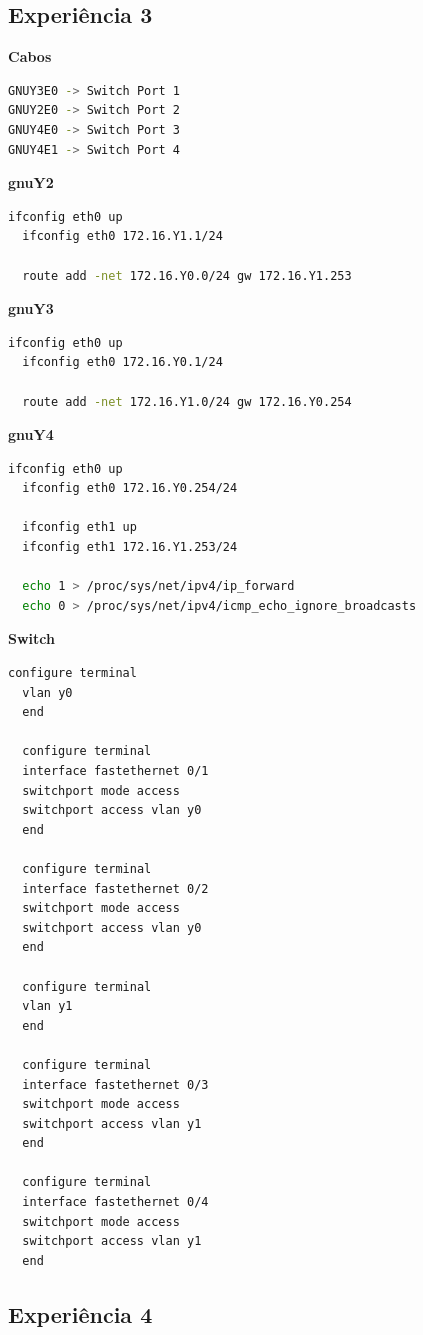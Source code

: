 \documentclass[article, a4paper, 11pt, oneside]{memoir}
\begin{document}
\subsection{Experiência 3} \label{exp3-conf}

\textbf{Cabos}
\begin{lstlisting}[language=bash]
GNUY3E0 -> Switch Port 1
GNUY2E0 -> Switch Port 2
GNUY4E0 -> Switch Port 3
GNUY4E1 -> Switch Port 4
\end{lstlisting}

\textbf{gnuY2}
\begin{lstlisting}[language=bash]
  ifconfig eth0 up
  ifconfig eth0 172.16.Y1.1/24

  route add -net 172.16.Y0.0/24 gw 172.16.Y1.253
\end{lstlisting}

\textbf{gnuY3}
\begin{lstlisting}[language=bash]
  ifconfig eth0 up
  ifconfig eth0 172.16.Y0.1/24

  route add -net 172.16.Y1.0/24 gw 172.16.Y0.254
\end{lstlisting}

\textbf{gnuY4}
\begin{lstlisting}[language=bash]
  ifconfig eth0 up
  ifconfig eth0 172.16.Y0.254/24

  ifconfig eth1 up 
  ifconfig eth1 172.16.Y1.253/24

  echo 1 > /proc/sys/net/ipv4/ip_forward
  echo 0 > /proc/sys/net/ipv4/icmp_echo_ignore_broadcasts
\end{lstlisting}

\textbf{Switch}
\begin{lstlisting}[language=bash]
  configure terminal
  vlan y0
  end

  configure terminal
  interface fastethernet 0/1
  switchport mode access
  switchport access vlan y0
  end

  configure terminal
  interface fastethernet 0/2
  switchport mode access
  switchport access vlan y0
  end

  configure terminal
  vlan y1 
  end 

  configure terminal
  interface fastethernet 0/3
  switchport mode access
  switchport access vlan y1
  end

  configure terminal
  interface fastethernet 0/4
  switchport mode access
  switchport access vlan y1
  end
\end{lstlisting}

\subsection{Experiência 4} \label{exp4-conf}
\end{document}
